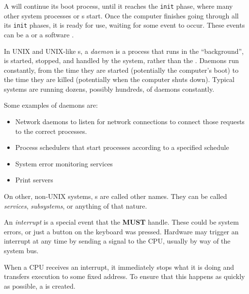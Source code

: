 A  will continue its boot process, until it reaches the \texttt{init} phase, where many other system processes or s start.
Once the computer finishes going through all its \texttt{init} phases, it is ready for use, waiting for some event to occur.
These events can be a   or a software .

\begin{definition}[Daemon]\label{def:Daemon}
  In UNIX and UNIX-like s, a \emph{daemon} is a  process that runs in the ``background'', is started, stopped, and handled by the system, rather than the .
  Daemons run constantly, from the time they are started (potentially the computer's boot) to the time they are killed (potentially when the computer shuts down).
  Typical systems are running dozens, possibly hundreds, of daemons constantly.

  Some examples of daemons are:
  \begin{itemize}[noitemsep]
  \item Network daemons to listen for network connections to connect those requests to the correct processes.
  \item Process schedulers that start processes according to a specified schedule
  \item System error monitoring services
  \item Print servers
  \end{itemize}

  \begin{remark}\label{rmk:Daemon_Other_Names}
    On other, non-UNIX systems, s are called other names.
    They can be called \emph{services}, \emph{subsystems}, or anything of that nature.
  \end{remark}
\end{definition}

\begin{definition}[Interrupt]\label{def:Interrupt}
  An \emph{interrupt} is a special event that the  \textbf{MUST} handle.
  These could be system errors, or just a button on the keyboard was pressed.
  Hardware may trigger an interrupt at any time by sending a signal to the CPU, usually by way of the system bus.

  When a CPU receives an interrupt, it immediately stops what it is doing and transfers execution to some fixed address.
  To ensure that this happens as quickly as possible, a  is created.
\end{definition}


